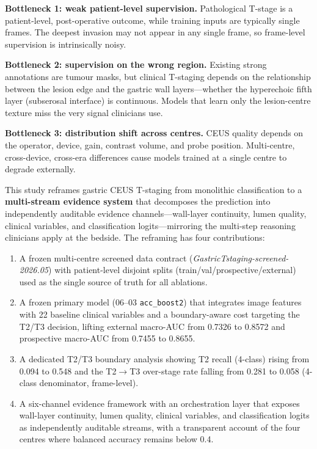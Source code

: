 \documentclass[11pt,a4paper]{article}
\begin{document}
\textbf{Bottleneck 1: weak patient-level supervision.} Pathological T-stage is a patient-level, post-operative outcome, while training inputs are typically single frames. The deepest invasion may not appear in any single frame, so frame-level supervision is intrinsically noisy.

\textbf{Bottleneck 2: supervision on the wrong region.} Existing strong annotations are tumour masks, but clinical T-staging depends on the relationship between the lesion edge and the gastric wall layers---whether the hyperechoic fifth layer (subserosal interface) is continuous. Models that learn only the lesion-centre texture miss the very signal clinicians use.

\textbf{Bottleneck 3: distribution shift across centres.} CEUS quality depends on the operator, device, gain, contrast volume, and probe position. Multi-centre, cross-device, cross-era differences cause models trained at a single centre to degrade externally.

This study reframes gastric CEUS T-staging from monolithic classification to a \textbf{multi-stream evidence system} that decomposes the prediction into independently auditable evidence channels---wall-layer continuity, lumen quality, clinical variables, and classification logits---mirroring the multi-step reasoning clinicians apply at the bedside. The reframing has four contributions:

\begin{enumerate}[leftmargin=*]
\item A frozen multi-centre screened data contract (\textit{GastricTstaging-screened-2026.05}) with patient-level disjoint splits (train/val/prospective/external) used as the single source of truth for all ablations.
\item A frozen primary model (06--03 \texttt{acc\_boost2}) that integrates image features with 22 baseline clinical variables and a boundary-aware cost targeting the T2/T3 decision, lifting external macro-AUC from 0.7326 to 0.8572 and prospective macro-AUC from 0.7455 to 0.8655.
\item A dedicated T2/T3 boundary analysis showing T2 recall (4-class) rising from 0.094 to 0.548 and the T2$\to$T3 over-stage rate falling from 0.281 to 0.058 (4-class denominator, frame-level).
\item A six-channel evidence framework with an orchestration layer that exposes wall-layer continuity, lumen quality, clinical variables, and classification logits as independently auditable streams, with a transparent account of the four centres where balanced accuracy remains below 0.4.
\end{enumerate}
\end{document}
